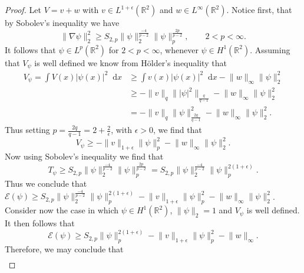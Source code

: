 \documentclass[a4paper,11pt]{article}
\newcommand*\diff{\mathop{}\!\mathrm{d}}
\newcommand{\R}{\mathbb{R}}
\numberwithin{equation}{section}
\begin{document}
\begin{proof}
	Let $ V=v+w $ with $ v\in L^{1+\epsilon}(\R^2)  $ and $ w\in L^\infty(\R^2) $. Notice first, that by Sobolev's inequality we have \begin{equation}
	\lVert\nabla\psi\rVert_2^2\geq S_{2,p}\lVert\psi\rVert_2^{\frac{-4}{p-2}}\lVert\psi\rVert_p^{\frac{2p}{p-2}},\qquad 2<p<\infty.
	\end{equation}
	It follows that $ \psi\in L^p(\R^2) $ for $ 2<p<\infty $, whenever $ \psi\in H^1(\R^2) $.
	Assuming that $ V_\psi $ is well defined we know from Hölder's inequality that\begin{equation}
	\begin{aligned}
	V_\psi=\int V(x)\lvert\psi(x)\rvert^2 \diff x&\geq\int v(x)\lvert\psi(x)\rvert^2 \diff x-\lVert w\rVert_\infty \lVert \psi\rVert_2^2\\&\geq-\lVert v\rVert_q\lVert|\psi|^2\rVert_{\frac{q}{q-1}}-\lVert w\rVert_\infty \lVert \psi\rVert_2^2\\&=-\lVert v\rVert_q\lVert\psi\rVert_{\frac{2q}{q-1}}^{2}-\lVert w\rVert_\infty \lVert \psi\rVert_2^2.
	\end{aligned}
	\end{equation} Thus setting $ p=\frac{2q}{q-1}=2+\frac{2}{\epsilon} $,
	 with $ \epsilon>0 $, we find that \begin{equation}
	V_\psi\geq-\lVert v\rVert_{1+\epsilon}\lVert \psi\rVert_p^2-\lVert w\rVert_\infty \lVert \psi\rVert_2^2.
	\end{equation}
	Now using Sobolev's inequality we find that\begin{equation}
	T_\psi\geq S_{2,p}\lVert \psi\rVert_2^{\frac{-4}{p-2}}\lVert \psi \rVert_p^{\frac{2p}{p-2}}=S_{2,p}\lVert \psi\rVert_2^{\frac{-4}{p-2}}\lVert \psi \rVert_p^{2(1+\epsilon)}.
	\end{equation}
	Thus we conclude that $ \mathcal{E}(\psi)\geq S_{2,p}\lVert \psi\rVert_2^{\frac{-4}{p-2}}\lVert \psi \rVert_p^{2(1+\epsilon)}-\lVert v\rVert_{1+\epsilon}\lVert \psi\rVert_p^2-\lVert w\rVert_\infty \lVert \psi\rVert_2^2 $.
	Consider now the case in which $ \psi\in H^1(\R^2) $, $ \lVert \psi \rVert_2=1 $ and $ V_\psi $ is well defined. It then follows that \begin{equation}
	\mathcal{E}(\psi)\geq S_{2,p}\lVert \psi \rVert_p^{2(1+\epsilon)}-\lVert v\rVert_{1+\epsilon}\lVert \psi\rVert_p^2-\lVert w\rVert_\infty.
	\end{equation}
	Therefore, we may conclude that \begin{equation}
	\begin{aligned}

\end{aligned}
\end{equation}
\end{proof}
\end{document}
